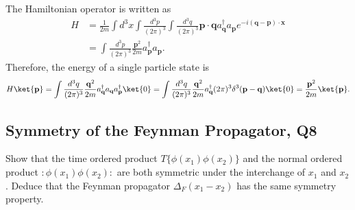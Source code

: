 \begin{solution}
    The Hamiltonian operator is written as
    \begin{equation}
        \begin{aligned}
            H &= \frac{1}{2m}\int d^3x \int \frac{d^3p}{(2\pi)^3}\int \frac{d^3q}{(2\pi)^3}\mathbf{p}\cdot\mathbf{q}a_\mathbf{q}^\dagger a_\mathbf{p} e^{-i(\mathbf{q}-\mathbf{p})\cdot\mathbf{x}}\\
            &=\int \frac{d^3p}{(2\pi)^3}\frac{\mathbf{p}^2}{2m}a_\mathbf{p}^\dagger a_\mathbf{p}.
        \end{aligned}
    \end{equation}
    Therefore, the energy of a single particle state is 
    \begin{equation}
        H\ket{\mathbf{p}} = \int \frac{d^3q}{(2\pi)^3}\frac{\mathbf{    q}^2}{2m}a_\mathbf{q}^\dagger a_\mathbf{q}a_\mathbf{p}^\dagger\ket{0} = \int \frac{d^3q}{(2\pi)^3}\frac{\mathbf{    q}^2}{2m}a_\mathbf{q}^\dagger (2\pi)^3\delta^3(\mathbf{p}-\mathbf{q})\ket{0} = \frac{\mathbf{p}^2}{2m}\ket{\mathbf{p}}.
    \end{equation}
\end{solution}

\subsection{Symmetry of the Feynman Propagator, Q8}

Show that the time ordered product $T\{\phi(x_1)\phi(x_2)\}$ and the normal ordered product $:\phi(x_1)\phi(x_2):$ are both symmetric under the interchange of $x_1$ and $x_2$. Deduce that the Feynman propagator $\Delta_F(x_1 - x_2)$ has the same symmetry property.

